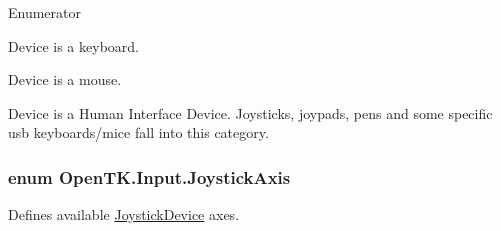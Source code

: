 \begin{Desc}
\item[Enumerator]\par
\begin{description}
\item[{\em 
\hypertarget{namespace_open_t_k_1_1_input_a1d147c6256b0adaa5288eec90ed93270a6ce4d85a628a88bbdb3ac24a8e5a9c2e}{Keyboard}\label{namespace_open_t_k_1_1_input_a1d147c6256b0adaa5288eec90ed93270a6ce4d85a628a88bbdb3ac24a8e5a9c2e}
}]Device is a keyboard. \item[{\em 
\hypertarget{namespace_open_t_k_1_1_input_a1d147c6256b0adaa5288eec90ed93270af2a47c6809d88e175dade0ef7b16aa13}{Mouse}\label{namespace_open_t_k_1_1_input_a1d147c6256b0adaa5288eec90ed93270af2a47c6809d88e175dade0ef7b16aa13}
}]Device is a mouse. \item[{\em 
\hypertarget{namespace_open_t_k_1_1_input_a1d147c6256b0adaa5288eec90ed93270ad3616a0a736b5a3c4c73f7b177921e8b}{Hid}\label{namespace_open_t_k_1_1_input_a1d147c6256b0adaa5288eec90ed93270ad3616a0a736b5a3c4c73f7b177921e8b}
}]Device is a Human Interface Device. Joysticks, joypads, pens and some specific usb keyboards/mice fall into this category. \end{description}
\end{Desc}
\hypertarget{namespace_open_t_k_1_1_input_ab565c2e944f2be911b6b39e1d5ee4fda}{
\subsubsection[{Joystick\-Axis}]{\setlength{\rightskip}{0pt plus 5cm}enum {\bf Open\-T\-K.\-Input.\-Joystick\-Axis}}}\label{namespace_open_t_k_1_1_input_ab565c2e944f2be911b6b39e1d5ee4fda}


Defines available \hyperlink{class_open_t_k_1_1_input_1_1_joystick_device}{Joystick\-Device} axes. 

